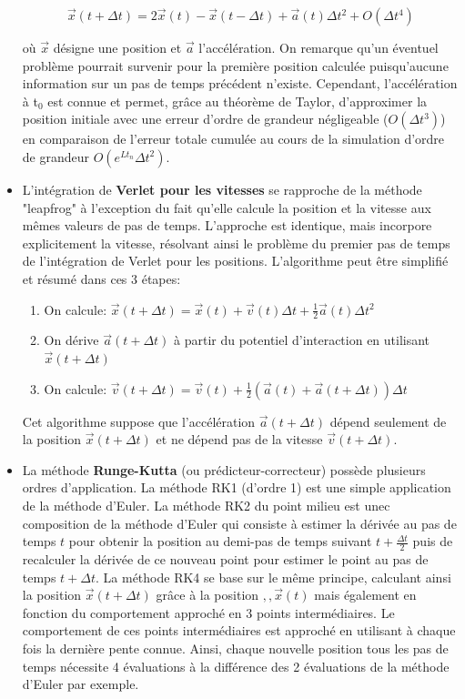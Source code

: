 \begin{itemize}
	$$\overrightarrow{x}(t +\Delta t) = 2\overrightarrow{x}(t) - \overrightarrow{x}(t - \Delta t) + \overrightarrow{a}(t)\Delta t^2 + O(\Delta t^4)$$ 

	où $\overrightarrow{x}$ désigne une position et $\overrightarrow{a}$ l'accélération.
	On remarque qu'un éventuel problème pourrait survenir pour la première position calculée puisqu'aucune information sur un pas de temps précédent n’existe. Cependant, l'accélération à t$_0$ est connue et permet, grâce au théorème de Taylor, d'approximer la position initiale avec une erreur d'ordre de grandeur négligeable ($O(\Delta t^3)$) en comparaison de l'erreur totale cumulée au cours de la simulation d'ordre de grandeur $O(e^{Lt_n}\Delta t^2)$.
	\item L'intégration de \textbf{Verlet pour les vitesses} se rapproche de la méthode "leapfrog" à l'exception du fait qu'elle calcule la position et la vitesse aux mêmes valeurs de pas de temps. L'approche est identique, mais incorpore explicitement la vitesse, résolvant ainsi le problème du premier pas de temps de l'intégration de Verlet pour les positions. L'algorithme peut être simplifié et résumé dans ces 3 étapes:
	\begin{enumerate}
		\item On calcule: $\overrightarrow{x}(t+\Delta t) = \overrightarrow{x}(t) + \overrightarrow{v}(t)\Delta t + \frac{1}{2}\overrightarrow{a}(t)\Delta t^2$
		\item On dérive $\overrightarrow{a}(t+\Delta t)$ à partir du potentiel d'interaction en utilisant $\overrightarrow{x}(t+\Delta t)$
		\item On calcule: $\overrightarrow{v}(t+\Delta t) = \overrightarrow{v}(t) + \frac{1}{2} (\overrightarrow{a}(t) + \overrightarrow{a}(t+\Delta t))\Delta t$
	\end{enumerate}
	Cet algorithme suppose que l'accélération $\overrightarrow{a}(t+\Delta t)$ dépend seulement de la position $\overrightarrow{x}(t+\Delta t)$ et ne dépend pas de la vitesse $\overrightarrow{v}(t+\Delta t)$.
	\item La méthode \textbf{Runge-Kutta} (ou prédicteur-correcteur) possède plusieurs ordres d'application. La méthode RK1 (d'ordre 1) est une simple application de la méthode d'Euler. La méthode RK2 du point milieu est unec composition de la méthode d'Euler qui consiste à estimer la dérivée au pas de temps $t$ pour obtenir la position au demi-pas de temps suivant $t+\frac{\Delta t}{2}$ puis de recalculer la dérivée de ce nouveau point pour estimer le point au pas de temps $t+\Delta t$. La méthode RK4 se base sur le même principe, calculant ainsi la position $\overrightarrow{x}(t+\Delta t)$ grâce à la position $,,\overrightarrow{x}(t)$ mais également en fonction du comportement approché en 3 points intermédiaires. Le comportement de ces points intermédiaires est approché en utilisant à chaque fois la dernière pente connue. Ainsi, chaque nouvelle position tous les pas de temps nécessite 4 évaluations à la différence des 2 évaluations de la méthode d'Euler par exemple.
\end{itemize}


